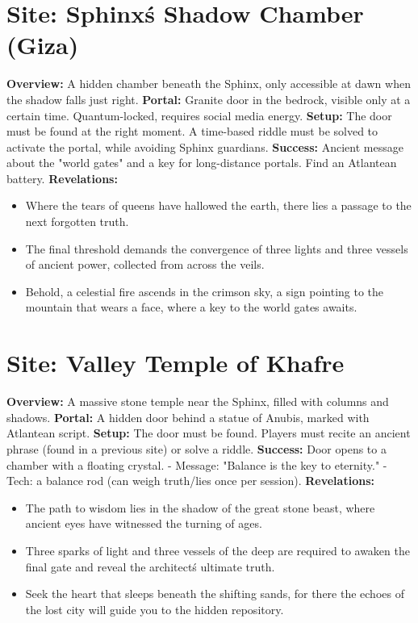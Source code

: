 \documentclass[12pt]{article}
\begin{document}
\hrulefill

\section*{Site: Sphinx\'s Shadow Chamber (Giza)}
\textbf{Overview:}
A hidden chamber beneath the Sphinx, only accessible at dawn when the shadow falls just right.
\textbf{Portal:}
Granite door in the bedrock, visible only at a certain time. Quantum-locked, requires social media energy.
\textbf{Setup:}
The door must be found at the right moment. A time-based riddle must be solved to activate the portal, while avoiding Sphinx guardians.
\textbf{Success:}
Ancient message about the "world gates" and a key for long-distance portals. Find an Atlantean battery.
\textbf{Revelations:}
\begin{itemize}
  \item Where the tears of queens have hallowed the earth, there lies a passage to the next forgotten truth.
  \item The final threshold demands the convergence of three lights and three vessels of ancient power, collected from across the veils.
  \item Behold, a celestial fire ascends in the crimson sky, a sign pointing to the mountain that wears a face, where a key to the world gates awaits.
\end{itemize}

\hrulefill

\section*{Site: Valley Temple of Khafre}
\textbf{Overview:}
A massive stone temple near the Sphinx, filled with columns and shadows.
\textbf{Portal:}
A hidden door behind a statue of Anubis, marked with Atlantean script.
\textbf{Setup:}
The door must be found. Players must recite an ancient phrase (found in a previous site) or solve a riddle.
\textbf{Success:}
Door opens to a chamber with a floating crystal.
- Message: "Balance is the key to eternity."
- Tech: a balance rod (can weigh truth/lies once per session).
\textbf{Revelations:}
\begin{itemize}
  \item The path to wisdom lies in the shadow of the great stone beast, where ancient eyes have witnessed the turning of ages.
  \item Three sparks of light and three vessels of the deep are required to awaken the final gate and reveal the architect\'s ultimate truth.
  \item Seek the heart that sleeps beneath the shifting sands, for there the echoes of the lost city will guide you to the hidden repository.
\end{itemize}
\end{document}
